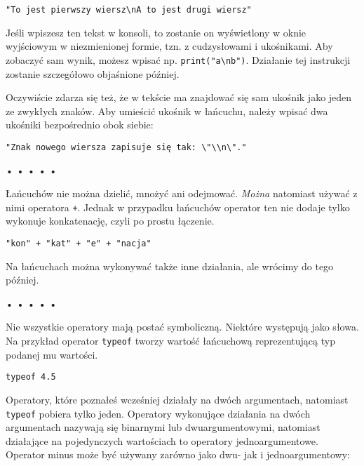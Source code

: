 \begin{verbatim} 
"To jest pierwszy wiersz\nA to jest drugi wiersz"
\end{verbatim}
    
Jeśli wpiszesz ten tekst w konsoli, to zostanie on wyświetlony w oknie wyjściowym w niezmienionej formie, tzn. z cudzysłowami i ukośnikami. Aby zobaczyć sam wynik, możesz wpisać np. \texttt{print("a\textbackslash nb")}. Działanie tej instrukcji zostanie szczegółowo objaśnione później.

    
Oczywiście zdarza się też, że w tekście ma znajdować się sam ukośnik jako jeden ze zwykłych znaków. Aby umieścić ukośnik w łańcuchu, należy wpisać dwa ukośniki bezpośrednio obok siebie:

    \begin{verbatim} 
"Znak nowego wiersza zapisuje się tak: \"\\n\"."
 \end{verbatim}
  
  \begin{center}
• • • • •
\end{center}
  
    
Łańcuchów nie można dzielić, mnożyć ani odejmować. \emph{Można} natomiast używać z nimi operatora \texttt{+}\index{+}. Jednak w przypadku łańcuchów operator ten nie dodaje tylko wykonuje konkatenację, czyli po prostu łączenie.

\begin{verbatim} 
"kon" + "kat" + "e" + "nacja"
\end{verbatim}
    
Na łańcuchach można wykonywać także inne działania, ale wrócimy do tego później.

  
  \begin{center}
• • • • •
\end{center}
  
    
Nie wszystkie operatory mają postać symboliczną. Niektóre występują jako słowa. Na przykład operator \texttt{typeof} tworzy wartość łańcuchową reprezentującą typ podanej mu wartości.

\begin{verbatim} 
typeof 4.5
\end{verbatim}
    
Operatory, które poznałeś wcześniej działały na dwóch argumentach, natomiast \texttt{typeof} pobiera tylko jeden. Operatory wykonujące działania na dwóch argumentach nazywają się binarnymi lub dwuargumentowymi, natomiast działające na pojedynczych wartościach to operatory jednoargumentowe. Operator minus\index{$-$} może być używany zarówno jako dwu- jak i jednoargumentowy:

